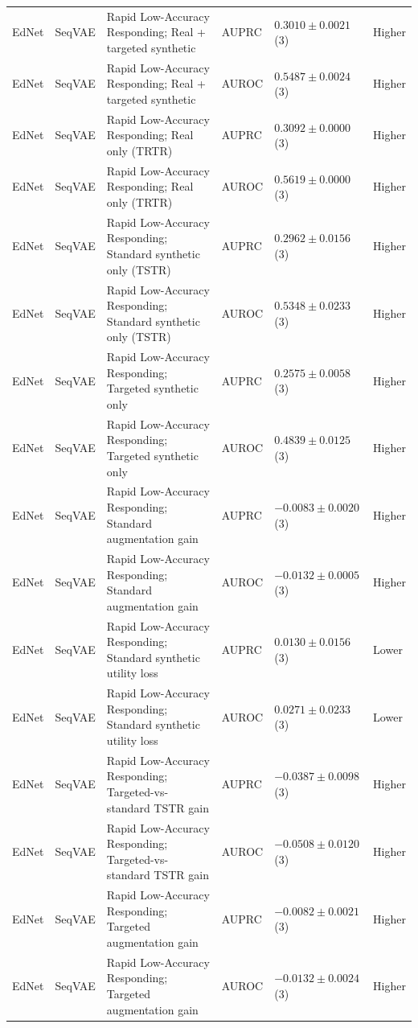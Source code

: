 \begin{longtable}{@{}p{2.25cm}p{2.05cm}p{4.7cm}p{5.0cm}p{2.6cm}p{1.25cm}@{}}
EdNet & SeqVAE & Rapid Low-Accuracy Responding; Real + targeted synthetic & AUPRC & $0.3010 \mathbin{\pm} 0.0021$ (3) & Higher \\
EdNet & SeqVAE & Rapid Low-Accuracy Responding; Real + targeted synthetic & AUROC & $0.5487 \mathbin{\pm} 0.0024$ (3) & Higher \\
EdNet & SeqVAE & Rapid Low-Accuracy Responding; Real only (TRTR) & AUPRC & $0.3092 \mathbin{\pm} 0.0000$ (3) & Higher \\
EdNet & SeqVAE & Rapid Low-Accuracy Responding; Real only (TRTR) & AUROC & $0.5619 \mathbin{\pm} 0.0000$ (3) & Higher \\
EdNet & SeqVAE & Rapid Low-Accuracy Responding; Standard synthetic only (TSTR) & AUPRC & $0.2962 \mathbin{\pm} 0.0156$ (3) & Higher \\
EdNet & SeqVAE & Rapid Low-Accuracy Responding; Standard synthetic only (TSTR) & AUROC & $0.5348 \mathbin{\pm} 0.0233$ (3) & Higher \\
EdNet & SeqVAE & Rapid Low-Accuracy Responding; Targeted synthetic only & AUPRC & $0.2575 \mathbin{\pm} 0.0058$ (3) & Higher \\
EdNet & SeqVAE & Rapid Low-Accuracy Responding; Targeted synthetic only & AUROC & $0.4839 \mathbin{\pm} 0.0125$ (3) & Higher \\
EdNet & SeqVAE & Rapid Low-Accuracy Responding; Standard augmentation gain & AUPRC & $-0.0083 \mathbin{\pm} 0.0020$ (3) & Higher \\
EdNet & SeqVAE & Rapid Low-Accuracy Responding; Standard augmentation gain & AUROC & $-0.0132 \mathbin{\pm} 0.0005$ (3) & Higher \\
EdNet & SeqVAE & Rapid Low-Accuracy Responding; Standard synthetic utility loss & AUPRC & $0.0130 \mathbin{\pm} 0.0156$ (3) & Lower \\
EdNet & SeqVAE & Rapid Low-Accuracy Responding; Standard synthetic utility loss & AUROC & $0.0271 \mathbin{\pm} 0.0233$ (3) & Lower \\
EdNet & SeqVAE & Rapid Low-Accuracy Responding; Targeted-vs-standard TSTR gain & AUPRC & $-0.0387 \mathbin{\pm} 0.0098$ (3) & Higher \\
EdNet & SeqVAE & Rapid Low-Accuracy Responding; Targeted-vs-standard TSTR gain & AUROC & $-0.0508 \mathbin{\pm} 0.0120$ (3) & Higher \\
EdNet & SeqVAE & Rapid Low-Accuracy Responding; Targeted augmentation gain & AUPRC & $-0.0082 \mathbin{\pm} 0.0021$ (3) & Higher \\
EdNet & SeqVAE & Rapid Low-Accuracy Responding; Targeted augmentation gain & AUROC & $-0.0132 \mathbin{\pm} 0.0024$ (3) & Higher \\

\end{longtable}
